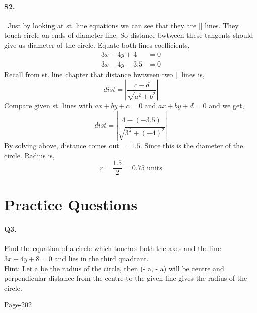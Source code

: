 \documentclass{article}
\begin{document}
\paragraph{S2.}\
Just by looking at st. line equations we can see that they are || lines. They touch circle on ends of diameter line. So distance bwtween these tangents should give us diameter of the circle. Equate both lines coefficients,
\begin{align*}
    3x-4y+4&=0\\
    3x-4y-3.5&=0
\end{align*}
Recall from st. line chapter that distance bwtween two || lines is,
\begin{equation*}
    dist=\left|\frac{c-d}{\sqrt{a^2+b^2}}\right|
\end{equation*}
Compare given st. lines with $ax+by+c=0$ and $ax+by+d=0$ and we get,
\begin{equation*}
    dist=\left|\frac{4-(-3.5)}{\sqrt{3^2+(-4)^2}}\right|
\end{equation*}
By solving above, distance comes out $=1.5$. Since this is the diameter of the circle. Radius is,
\begin{equation*}
    r=\frac{1.5}{2}=0.75 \text{  units}
\end{equation*}
\clearpage
\section*{Practice Questions}
\paragraph{Q3.}Find the equation of a circle which touches both the axes and the line $3x - 4y + 8 = 0$
and lies in the third quadrant.\\
Hint:  Let  a  be  the  radius  of  the  circle,  then  (-  a,  -  a)  will  be  centre  and perpendicular distance from the centre to the given line gives the radius of the
circle.
\begin{flushright}
Page-202
\end{flushright}
\end{document}
